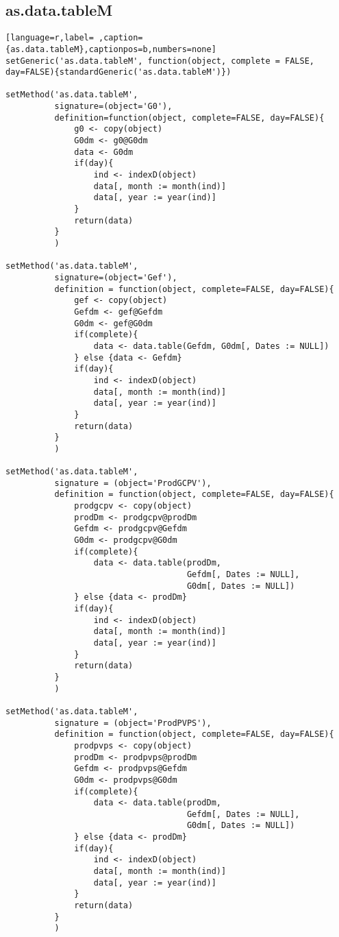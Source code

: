 \subsection{as.data.tableM}
\label{sec:orgdef4378}
\label{subsec:as.data.tablem}
\begin{lstlisting}[language=r,label= ,caption={as.data.tableM},captionpos=b,numbers=none]
setGeneric('as.data.tableM', function(object, complete = FALSE, day=FALSE){standardGeneric('as.data.tableM')})

setMethod('as.data.tableM',
          signature=(object='G0'),
          definition=function(object, complete=FALSE, day=FALSE){
              g0 <- copy(object)
              G0dm <- g0@G0dm
              data <- G0dm
              if(day){
                  ind <- indexD(object)
                  data[, month := month(ind)]
                  data[, year := year(ind)]
              }
              return(data)
          }
          )

setMethod('as.data.tableM',
          signature=(object='Gef'),
          definition = function(object, complete=FALSE, day=FALSE){
              gef <- copy(object)
              Gefdm <- gef@Gefdm
              G0dm <- gef@G0dm
              if(complete){
                  data <- data.table(Gefdm, G0dm[, Dates := NULL])
              } else {data <- Gefdm}
              if(day){
                  ind <- indexD(object)
                  data[, month := month(ind)]
                  data[, year := year(ind)]
              }
              return(data)
          }
          )

setMethod('as.data.tableM',
          signature = (object='ProdGCPV'),
          definition = function(object, complete=FALSE, day=FALSE){
              prodgcpv <- copy(object)
              prodDm <- prodgcpv@prodDm
              Gefdm <- prodgcpv@Gefdm
              G0dm <- prodgcpv@G0dm
              if(complete){
                  data <- data.table(prodDm,
                                     Gefdm[, Dates := NULL],
                                     G0dm[, Dates := NULL])
              } else {data <- prodDm}
              if(day){
                  ind <- indexD(object)
                  data[, month := month(ind)]
                  data[, year := year(ind)]
              }
              return(data)
          }
          )

setMethod('as.data.tableM',
          signature = (object='ProdPVPS'),
          definition = function(object, complete=FALSE, day=FALSE){
              prodpvps <- copy(object)
              prodDm <- prodpvps@prodDm
              Gefdm <- prodpvps@Gefdm
              G0dm <- prodpvps@G0dm
              if(complete){
                  data <- data.table(prodDm,
                                     Gefdm[, Dates := NULL],
                                     G0dm[, Dates := NULL])
              } else {data <- prodDm}
              if(day){
                  ind <- indexD(object)
                  data[, month := month(ind)]
                  data[, year := year(ind)]
              }
              return(data)
          }
          )
\end{lstlisting}
